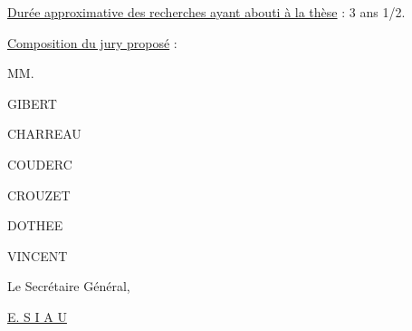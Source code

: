 \uline{Durée approximative des recherches ayant abouti à la thèse} : 3 ans 1/2.

\uline{Composition du jury proposé} :

MM.

GIBERT

CHARREAU

COUDERC

CROUZET

DOTHEE

VINCENT

Le Secrétaire Général,


\uline{E. S I A U}

